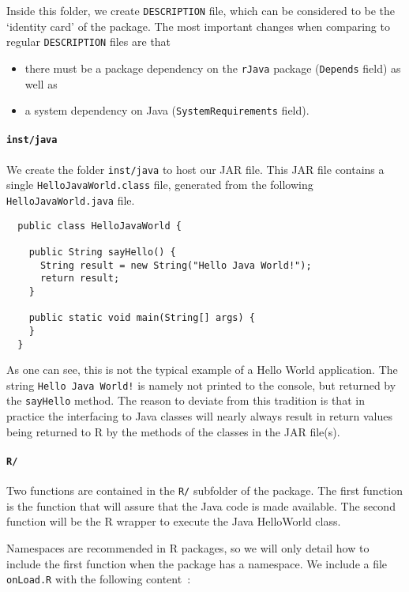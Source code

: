 \documentclass[a4paper, 11pt]{article}
\begin{document}
Inside this folder, we create \texttt{DESCRIPTION} file, 
which can be considered to be the `identity card'
of the package. The most important changes when comparing to 
regular \texttt{DESCRIPTION} files are that 
\begin{itemize}
  \item there must be a package dependency on the
     \texttt{rJava} package (\texttt{Depends} field) as well as 
  \item a system dependency on Java (\texttt{SystemRequirements} field). 
\end{itemize}

\paragraph{\texttt{inst/java}}

We create the folder \verb|inst/java| to host our JAR file. This JAR file
contains a single \texttt{HelloJavaWorld.class} file, generated from the following
\texttt{HelloJavaWorld.java} file.

\begin{verbatim}
  public class HelloJavaWorld {
   
    public String sayHello() {
      String result = new String("Hello Java World!");
      return result;
    }
  
    public static void main(String[] args) {
    }
  } 
\end{verbatim}

As one can see, this is not the typical example of a Hello World application.
The string \texttt{Hello Java World!} is namely not printed to the console,
but returned by the \texttt{sayHello} method. The reason to deviate from this
tradition is that in practice the interfacing to Java classes will nearly 
always result in return values being returned to R by the methods of the
classes in the JAR file(s). 
 

\paragraph{\texttt{R/}}

Two functions are contained in the \texttt{R/} subfolder of the package.
The first function is the function that will assure that the
Java code is made available. The second function will be the
R wrapper to execute the Java HelloWorld class.

Namespaces are recommended in R packages, so we will only
detail how to include the first function when the package
has a namespace. We include a file \texttt{onLoad.R} with
the following content~:
\end{document}
